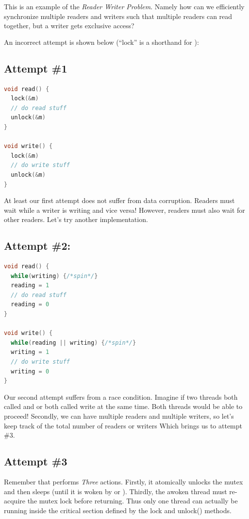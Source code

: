 This is an example of the \emph{Reader Writer Problem}.
Namely how can we efficiently synchronize multiple readers and writers such that multiple readers can read together, but a writer gets exclusive access?

An incorrect attempt is shown below (``lock'' is a shorthand for ):

\subsection{Attempt \#1}

\begin{lstlisting}[language=C]
void read() {
  lock(&m)
  // do read stuff
  unlock(&m)
}

void write() {
  lock(&m)
  // do write stuff
  unlock(&m)
}
\end{lstlisting}

At least our first attempt does not suffer from data corruption.
Readers must wait while a writer is writing and vice versa!
However, readers must also wait for other readers.
Let's try another implementation.

\subsection{Attempt \#2:}

\begin{lstlisting}[language=C]
void read() {
  while(writing) {/*spin*/}
  reading = 1
  // do read stuff
  reading = 0
}

void write() {
  while(reading || writing) {/*spin*/}
  writing = 1
  // do write stuff
  writing = 0
}
\end{lstlisting}

Our second attempt suffers from a race condition.
Imagine if two threads both called  and  or both called write at the same time.
Both threads would be able to proceed!
Secondly, we can have multiple readers and multiple writers, so let's keep track of the total number of readers or writers
Which brings us to attempt \#3.

\subsection{Attempt \#3}

Remember that  performs \emph{Three} actions.
Firstly, it atomically unlocks the mutex and then sleeps (until it is woken by  or ).
Thirdly, the awoken thread must re-acquire the mutex lock before returning.
Thus only one thread can actually be running inside the critical section defined by the lock and unlock() methods.

